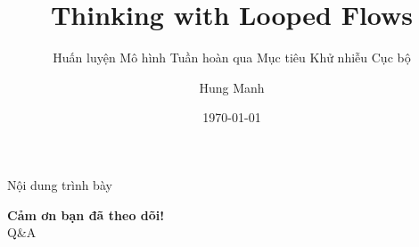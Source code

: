 \documentclass[aspectratio=169]{beamer}
\title[Looped Flows]{Thinking with Looped Flows}
\subtitle{Huấn luyện Mô hình Tuần hoàn qua Mục tiêu Khử nhiễu Cục bộ}
\author{Hung Manh}
\date{\today}
\begin{document}
\begin{frame}
    \titlepage
\end{frame}

\begin{frame}{Nội dung trình bày}
    \tableofcontents
\end{frame}



\begin{frame}
    \centering
    \Huge \textbf{Cảm ơn bạn đã theo dõi!}\\
    \vspace{0.5cm}
    \Large Q\&A
\end{frame}
\end{document}

